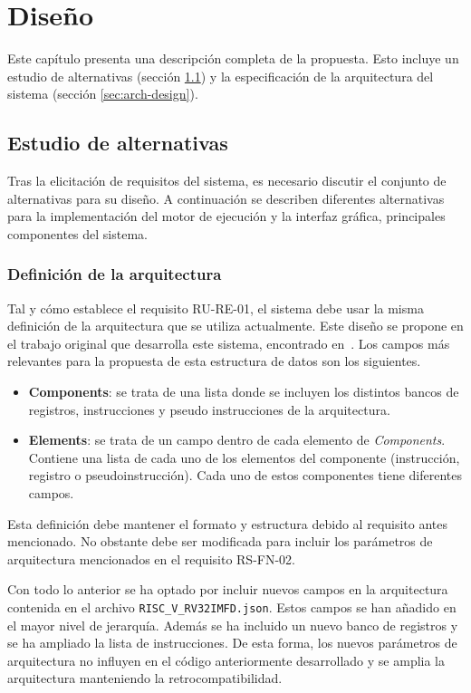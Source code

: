 \chapter{Diseño}\label{chap:design}

Este capítulo presenta una descripción completa de la propuesta. Esto incluye
un estudio de alternativas (sección \ref{alternativas}) y la especificación de
la arquitectura del sistema (sección \ref{sec:arch-design}).

\section{Estudio de alternativas}\label{alternativas}
Tras la elicitación de requisitos del sistema, es necesario discutir el conjunto de alternativas para su diseño. A continuación se describen diferentes alternativas para la implementación del motor de ejecución y la interfaz gráfica, principales componentes del sistema.

\subsection{Definición de la arquitectura}\label{subsec:defi-arch}
Tal y cómo establece el requisito RU-RE-01, el sistema debe usar la misma definición de la arquitectura que se utiliza actualmente. Este diseño se propone en el trabajo original que desarrolla este sistema, encontrado en~\cite{camarmasCREATOR}. Los campos más relevantes para la propuesta de esta estructura de datos son los siguientes. 

\begin{itemize}
\item \textbf{Components}: se trata de una lista donde se incluyen los distintos bancos de registros, instrucciones y pseudo instrucciones de la arquitectura.
\item \textbf{Elements}: se trata de un campo dentro de cada elemento de \textit{Components}. Contiene una lista de cada uno de los elementos del componente (instrucción, registro o pseudoinstrucción). Cada uno de estos componentes tiene diferentes campos.
\end{itemize}

Esta definición debe mantener el formato y estructura debido al requisito antes mencionado. No obstante debe ser modificada para incluir los parámetros de arquitectura mencionados en el requisito RS-FN-02.

Con todo lo anterior se ha optado por incluir nuevos campos en la arquitectura contenida en el archivo \texttt{RISC\_V\_RV32IMFD.json}. Estos campos se han añadido en el mayor nivel de jerarquía. Además se ha incluido un nuevo banco de registros y se ha ampliado la lista de instrucciones. De esta forma, los nuevos parámetros de arquitectura no influyen en el código anteriormente desarrollado y se amplia la arquitectura manteniendo la retrocompatibilidad.

